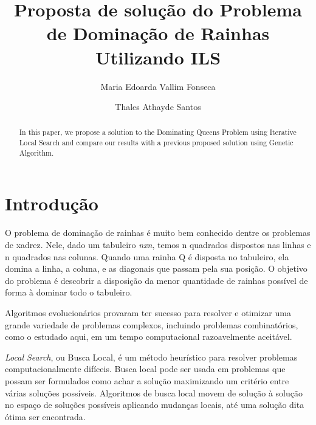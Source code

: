 \documentclass[sigconf]{acmart}
\begin{document}
\title{Proposta de solução do Problema de Dominação de Rainhas Utilizando ILS}

\author{Maria Edoarda Vallim Fonseca}

\author{Thales Athayde Santos}

\begin{abstract}
In this paper, we propose a solution to the Dominating Queens Problem
using Iterative Local Search and compare our results with a previous
proposed solution using Genetic Algorithm.
\end{abstract}

%
%


\maketitle

\section{Introdução}

O problema de dominação de rainhas é muito bem conhecido
dentre os problemas de xadrez. Nele, dado um tabuleiro \textit{nxn}, temos n quadrados
dispostos nas linhas e n quadrados nas colunas. Quando uma rainha Q 
é disposta no tabuleiro, ela domina a linha, a coluna, e as diagonais
que passam pela sua posição. O objetivo do problema é descobrir a disposição da
 menor quantidade de rainhas possível de forma à dominar todo o tabuleiro.

 Algoritmos evolucionários provaram ter sucesso para resolver e otimizar
  uma grande variedade de problemas complexos, incluindo problemas combinatórios,
  como o estudado aqui, em um tempo computacional razoavelmente aceitável.~\cite{doerr2011evolutionary}

\textit{Local Search}, ou Busca Local, é um método heurístico para resolver problemas 
computacionalmente difíceis. Busca local pode ser usada em problemas
que possam ser formulados como achar a solução maximizando um critério entre várias
soluções possíveis. Algoritmos de busca local movem de solução à solução no espaço de 
soluções possíveis aplicando mudanças locais, até uma solução dita ótima ser encontrada.~\cite{hoos2004stochastic}
\end{document}
